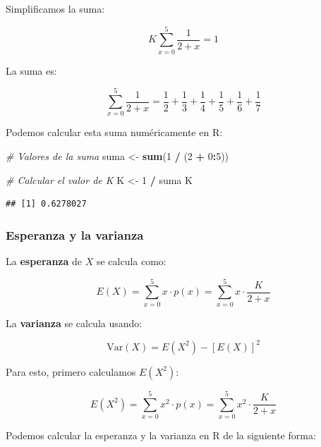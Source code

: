 \documentclass[
]{article}
\newenvironment{Shaded}{\begin{snugshade}}{\end{snugshade}}
\newcommand{\CommentTok}[1]{\textcolor[rgb]{0.56,0.35,0.01}{\textit{#1}}}
\newcommand{\DecValTok}[1]{\textcolor[rgb]{0.00,0.00,0.81}{#1}}
\newcommand{\FunctionTok}[1]{\textcolor[rgb]{0.13,0.29,0.53}{\textbf{#1}}}
\newcommand{\NormalTok}[1]{#1}
\newcommand{\OtherTok}[1]{\textcolor[rgb]{0.56,0.35,0.01}{#1}}
\newcommand{\SpecialCharTok}[1]{\textcolor[rgb]{0.81,0.36,0.00}{\textbf{#1}}}
\begin{document}
Simplificamos la suma:

\[
K \sum_{x=0}^{5} \frac{1}{2+x} = 1
\]

La suma es:

\[
\sum_{x=0}^{5} \frac{1}{2+x} = \frac{1}{2} + \frac{1}{3} + \frac{1}{4} + \frac{1}{5} + \frac{1}{6} + \frac{1}{7}
\]

Podemos calcular esta suma numéricamente en R:

\begin{Shaded}
\begin{Highlighting}[]
\CommentTok{\# Valores de la suma}
\NormalTok{suma }\OtherTok{\textless{}{-}} \FunctionTok{sum}\NormalTok{(}\DecValTok{1} \SpecialCharTok{/}\NormalTok{ (}\DecValTok{2} \SpecialCharTok{+} \DecValTok{0}\SpecialCharTok{:}\DecValTok{5}\NormalTok{))}

\CommentTok{\# Calcular el valor de K}
\NormalTok{K }\OtherTok{\textless{}{-}} \DecValTok{1} \SpecialCharTok{/}\NormalTok{ suma}
\NormalTok{K}
\end{Highlighting}
\end{Shaded}

\begin{verbatim}
## [1] 0.6278027
\end{verbatim}

\subsubsection{Esperanza y la varianza}\label{esperanza-y-la-varianza}

La \textbf{esperanza} de \(X\) se calcula como:

\[
E(X) = \sum_{x=0}^{5} x \cdot p(x) = \sum_{x=0}^{5} x \cdot \frac{K}{2+x}
\]

La \textbf{varianza} se calcula usando:

\[
\text{Var}(X) = E(X^2) - [E(X)]^2
\]

Para esto, primero calculamos \(E(X^2)\):

\[
E(X^2) = \sum_{x=0}^{5} x^2 \cdot p(x) = \sum_{x=0}^{5} x^2 \cdot \frac{K}{2+x}
\]

Podemos calcular la esperanza y la varianza en R de la siguiente forma:
\end{document}
